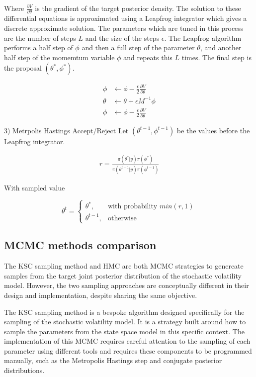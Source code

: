 \documentclass[12pt, a4paper]{article}
\begin{document}
        Where $\frac{\partial V}{\partial \theta}$ is the gradient of the target posterior density. The solution to these differential equations is approximated using a Leapfrog integrator which gives a discrete approximate solution. The parameters which are tuned in this process are the number of steps $L$ and the size of the steps $\epsilon$. The Leapfrog algorithm performs a half step of $\phi$ and then a full step of the parameter $\theta$, and another half step of the momemtum variable $\phi$ and repeats this $L$ times. The final step is the proposal $(\theta^{\ast}, \phi^{\ast})$.

        $$
        \begin{aligned}
        \phi &\leftarrow \phi - \frac{\epsilon}{2} \frac{\partial V}{\partial \theta} \\
        \theta &\leftarrow \theta + \epsilon M^{-1} \phi \\
        \phi &\leftarrow \phi - \frac{\epsilon}{2} \frac{\partial V}{\partial \theta}
        \end{aligned}
        $$

        3) Metrpolis Hastings Accept/Reject
        Let $(\theta^{t-1}, \phi^{t-1})$ be the values before the Leapfrog integrator.

        $$
        \begin{aligned}
        r = \frac{\pi(\theta^{\ast} | y) \pi(\phi^{\ast})}{\pi(\theta^{t-1} | y) \pi(\phi^{t-1})}
        \end{aligned}
        $$

        With sampled value

        $$
        \theta^t = \begin{cases}
            \theta^{\ast},& \text{with probability } min(r,1)\\
            \theta^{t-1}, & \text{otherwise}
        \end{cases}
        $$

    \subsection{MCMC methods comparison}
        The KSC sampling method and HMC are both MCMC strategies to genereate samples from the target joint posterior distribution of the stochastic volatility model. However, the two sampling approaches are conceptually different in their design and implementation, despite sharing the same objective.
        
        The KSC sampling method is a bespoke algorithm designed specifically for the sampling of the stochastic volatility model. It is a strategy built around how to sample the parameters from the state space model in this specific context. The implementation of this MCMC requires careful attention to the sampling of each parameter using different tools and requires these components to be programmed manually, such as the Metropolis Hastings step and conjugate posterior distributions. 
    
\end{document}
